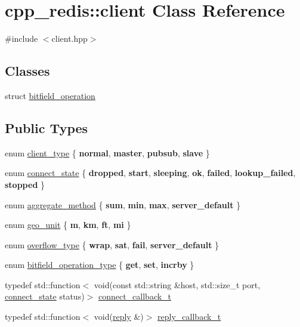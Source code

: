 \hypertarget{classcpp__redis_1_1client}{}\section{cpp\+\_\+redis\+:\+:client Class Reference}
\label{classcpp__redis_1_1client}


{\ttfamily \#include $<$client.\+hpp$>$}

\subsection*{Classes}
\begin{DoxyCompactItemize}
\item 
struct \hyperlink{structcpp__redis_1_1client_1_1bitfield__operation}{bitfield\+\_\+operation}
\end{DoxyCompactItemize}
\subsection*{Public Types}
\begin{DoxyCompactItemize}
\item 
enum \hyperlink{classcpp__redis_1_1client_a388877b01b4e045cddb138e70a68e000}{client\+\_\+type} \{ {\bfseries normal}, 
{\bfseries master}, 
{\bfseries pubsub}, 
{\bfseries slave}
 \}
\item 
enum \hyperlink{classcpp__redis_1_1client_a2512bd48dd45391249a69bd720c1e4da}{connect\+\_\+state} \{ \newline
{\bfseries dropped}, 
{\bfseries start}, 
{\bfseries sleeping}, 
{\bfseries ok}, 
\newline
{\bfseries failed}, 
{\bfseries lookup\+\_\+failed}, 
{\bfseries stopped}
 \}
\item 
enum \hyperlink{classcpp__redis_1_1client_aa197ca5b36da793c701d3ba388ec4946}{aggregate\+\_\+method} \{ {\bfseries sum}, 
{\bfseries min}, 
{\bfseries max}, 
{\bfseries server\+\_\+default}
 \}
\item 
enum \hyperlink{classcpp__redis_1_1client_aa5998536fd32ff4387c89be514997620}{geo\+\_\+unit} \{ {\bfseries m}, 
{\bfseries km}, 
{\bfseries ft}, 
{\bfseries mi}
 \}
\item 
enum \hyperlink{classcpp__redis_1_1client_a4119182ad3a01c1bb626a174375e114a}{overflow\+\_\+type} \{ {\bfseries wrap}, 
{\bfseries sat}, 
{\bfseries fail}, 
{\bfseries server\+\_\+default}
 \}
\item 
enum \hyperlink{classcpp__redis_1_1client_a2e2023534299541da0a659802e2f087d}{bitfield\+\_\+operation\+\_\+type} \{ {\bfseries get}, 
{\bfseries set}, 
{\bfseries incrby}
 \}
\item 
typedef std\+::function$<$ void(const std\+::string \&host, std\+::size\+\_\+t port, \hyperlink{classcpp__redis_1_1client_a2512bd48dd45391249a69bd720c1e4da}{connect\+\_\+state} status)$>$ \hyperlink{classcpp__redis_1_1client_a4bb592b64ededde5a6fcf8111ca2548f}{connect\+\_\+callback\+\_\+t}
\item 
typedef std\+::function$<$ void(\hyperlink{classcpp__redis_1_1reply}{reply} \&)$>$ \hyperlink{classcpp__redis_1_1client_a061a1140d36d2eaeda82b09a0bb3f9f2}{reply\+\_\+callback\+\_\+t}
\end{DoxyCompactItemize}
